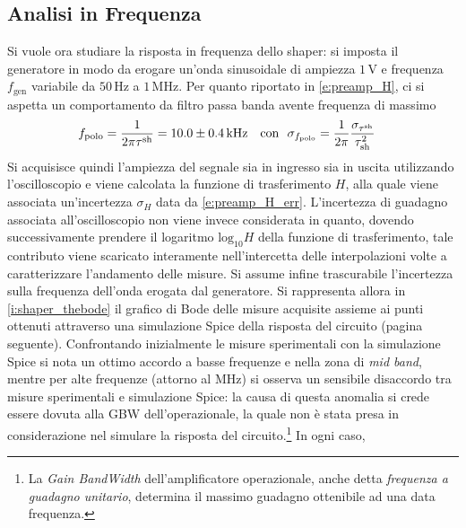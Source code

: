 \documentclass[a4paper,11pt]{article} %
\begin{document}

\subsection{Analisi in Frequenza}\label{s:shaper_bode}

Si vuole ora studiare la risposta in frequenza dello shaper: si imposta il generatore in modo da erogare un'onda
sinusoidale di ampiezza $1\,\si{\volt}$ e frequenza $f_{\text{gen}}$ variabile da $50\,\si{\Hz}$ a $1\,\si{\MHz}$. Per
quanto riportato in \autoref{e:preamp_H}, ci si aspetta un comportamento da filtro passa banda avente frequenza di
massimo
\begin{align}\label{e:shaper_ft_th}
	f_{\text{polo}}&=\frac{1}{2\pi \tau^{\text{sh}}}= 10.0 \pm 0.4 \,\si{k\Hz} & 
	\text{con\,\,\,\,}\sigma_{f_{\text{polo}}}&
	=\frac{1}{2\pi}\frac{\sigma_{\tau^{\text{sh}}}}{\tau^{2}_{\text{sh}}}																		
\end{align}
\noindent  Si acquisisce quindi l'ampiezza del segnale sia in ingresso sia in uscita utilizzando l'oscilloscopio e viene
calcolata la funzione di trasferimento $H$, alla quale viene associata un'incertezza $\sigma_{H}$ data da
\autoref{e:preamp_H_err}. L'incertezza di guadagno associata all'oscilloscopio non viene invece considerata in quanto,
dovendo successivamente prendere il logaritmo $\text{log}_{10}H$ della funzione di trasferimento, tale contributo viene
scaricato interamente nell'intercetta delle interpolazioni volte a caratterizzare l'andamento delle misure. Si assume
infine trascurabile l'incertezza sulla frequenza dell'onda erogata dal generatore. Si rappresenta allora in
\autoref{i:shaper_thebode} il grafico di Bode delle misure acquisite assieme ai punti ottenuti attraverso una
simulazione Spice della risposta del circuito (pagina seguente). Confrontando inizialmente le misure sperimentali con la
simulazione Spice si nota un ottimo accordo a basse frequenze e nella zona di \textit{mid band}, mentre per alte
frequenze (attorno al MHz) si osserva un sensibile disaccordo tra misure sperimentali e simulazione Spice: la causa di
questa anomalia si crede essere dovuta alla GBW dell'operazionale, la quale non è stata presa in considerazione nel
simulare la risposta del circuito.\footnote{La \textit{Gain BandWidth} dell'amplificatore operazionale, anche detta
\textit{frequenza a guadagno unitario}, determina il massimo guadagno ottenibile ad una data frequenza.} In ogni caso,
\end{document}
